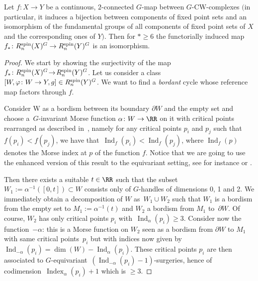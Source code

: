 	\begin{Theorem}\label{G2conn}
		Let $f\colon X \rightarrow Y$ be a continuous, $2$-connected $G$-map
		between $G$-CW-complexes $($in particular, it induces a bijection
		between components of fixed point sets and an isomorphism of the
		fundamental groups of all
		components of fixed point sets of $X$ and the corresponding ones of
		$Y)$. Then for $*\ge 6$ the
		functorially induced map
$f_{*}\colon R_{n}^{\rm spin}(X)^{G} \rightarrow R_{n}^{\rm spin}(Y)^{G}
$
		is an isomorphism.
	\end{Theorem}
	\begin{proof}
\! We start by showing the surjectivity of the map
$f_{*}\colon R_{n}^{\rm spin}(X)^{G} \!\rightarrow\! R_{n}^{\rm spin}(Y)^{G}$.
		Let us consider a class $[W,\varphi\colon W \rightarrow Y, g] \in
		R_{n}^{\rm spin}(Y)^{G}$. We want to find a \textit{bordant} cycle whose reference map factors through $f$.
		
Consider W as a bordism between its boundary $\partial W$ and the empty set
		and choose a~$G$-invariant Morse function $\alpha\colon W\to \RR$ on it with
		critical points rearranged as described in~\cite[Theorem 4.8]{Milnor}, namely
		for any critical points $p_{i}$ and $p_{j}$ such that $f(p_{i}) < f(p_{j})$,
		we have that~${\operatorname{Ind}_f(p_{i}) < \operatorname{Ind}_f(p_{j})}$, where $\operatorname{Ind}_f(p)$ denotes the Morse index at $p$ of the function $f$. Notice that we are going to use the
		enhanced version of this result to the equivariant setting, see for instance
		\cite{Mayer} or \cite{Wasserman}.
		
		Then there exists a suitable $t\in \RR$ such that the subset $W_1:=\alpha^{-1}([0,t])\subset W$ consists only of $G$-handles of dimensions 0, 1 and 2. We immediately obtain a decomposition of $W$ as~${W_{1} \cup W_{2}}$ such that $W_{1}$ is a bordism from the empty set to $M_{1}:=\alpha^{-1}(t)$ and $W_{2}$ a bordism from $M_{1}$ to~$\partial W$.
		Of course, $W_{2}$ has only critical points $p_{i}$ with~$\operatorname{Ind}_{\alpha}(p_{i}) \geq 3$. Consider now the function~$-\alpha$: this is a Morse function on $W_{2}$ seen as a bordism from $\partial W$ to $M_{1}$ with same critical points~$p_{i}$ but with indices now given by $\operatorname{Ind}_{-\alpha}(p_{i})=\dim(W)-\operatorname{Ind}_{\alpha}(p_{i})$. These critical points $p_{i}$ are then associated to $G$-equivariant~${(\operatorname{Ind}_{-\alpha}(p_{i})-1)}$-surgeries, hence of codimension~${\operatorname{Index}_{\alpha}(p_{i})+1}$ which is $\geq 3$.
		

\end{proof}
